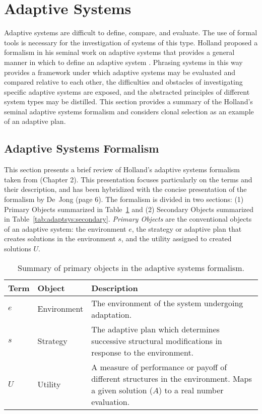 \documentclass[a4paper, 11pt]{article}
\begin{document}
% 
% 
\section{Adaptive Systems}
\label{sub:adaptive}
Adaptive systems are difficult to define, compare, and evaluate. The use of formal tools is necessary for the investigation of systems of this type. Holland proposed a formalism in his seminal work on adaptive systems that provides a general manner in which to define an adaptive system \cite{Holland1975}. Phrasing systems in this way provides a framework under which adaptive systems may be evaluated and compared relative to each other, the difficulties and obstacles of investigating specific adaptive systems are exposed, and the abstracted principles of different system types may be distilled. This section provides a summary of the Holland's seminal adaptive systems formalism and considers clonal selection as an example of an adaptive plan.

\subsection{Adaptive Systems Formalism}
This section presents a brief review of Holland's adaptive systems formalism taken from \cite{Holland1975} (Chapter 2). This presentation focuses particularly on the terms and their description, and has been hybridized with the concise presentation of the formalism by De~Jong \cite{Jong1975} (page 6). The formalism is divided in two sections: (1) Primary Objects summarized in Table~\ref{tab:adaptsys:primary} and (2) Secondary Objects summarized in Table~\ref{tab:adaptsys:secondary}. \emph{Primary Objects} are the conventional objects of an adaptive system: the environment $e$, the strategy or adaptive plan that creates solutions in the environment $s$, and the utility assigned to created solutions $U$.

\begin{table}[ht]
	\centering\small
		\begin{tabularx}{\textwidth}{llX}
		\toprule
		\textbf{Term} & \textbf{Object} & \textbf{Description} \\ 
		\toprule
		$e$ & Environment & The environment of the system undergoing adaptation. \\ 
		\midrule
		$s$ & Strategy & The adaptive plan which determines successive structural modifications in response to the environment. \\ 
		\midrule
		$U$ & Utility & A measure of performance or payoff of different structures in the environment. Maps a given solution ($A$) to a real number evaluation. \\ 
		\bottomrule
		\end{tabularx}	
	\caption{Summary of primary objects in the adaptive systems formalism.}
	\label{tab:adaptsys:primary}
\end{table}
\end{document}
